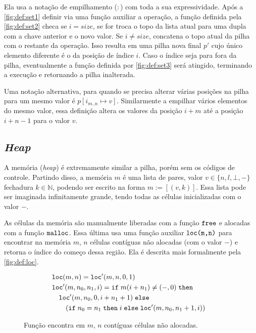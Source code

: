 Ela usa a notação de empilhamento ($:$) com toda a sua expressividade. Após a \autoref{fig:def:set1} definir via uma função auxiliar a operação, a função definida pela \autoref{fig:def:set2} checa se $i = size$, se for troca o topo da lista atual para uma dupla com a chave anterior e o novo valor. Se $i \neq size$, concatena o topo atual da pilha com o restante da operação. Isso resulta em uma pilha nova final $p'$ cujo único elemento diferente é o da posição de índice $i$. Caso o índice seja para fora da pilha, eventualmente a função definida por \autoref{fig:def:set3} será atingido, terminando a execução e retornando a pilha inalterada.

Uma notação alternativa, para quando se precisa alterar várias posições na pilha para um mesmo valor é $p[i_{m..n} \mapsto v]$. Similarmente a empilhar vários elementos do mesmo valor, essa definição altera os valores da posição $i + m$ até a posição $i + n - 1$ para o valor $v$.


\subsection{\emph{Heap}}
\label{sec:pcl-back:mem}

A memória (\emph{heap}) é extremamente similar a pilha, porém sem os códigos de controle. Partindo disso, a memória $m$ é uma lista de pares, valor $v \in \{n, l, \bot, -\}$ fechadura $k \in \mathbb{N}$, podendo ser escrito na forma $m := [(v, k)]$. Essa lista pode ser imaginada infinitamente grande, tendo todas as células inicializadas com o valor $-$.

As células da memória são manualmente liberadas com a função $\texttt{free}$ e alocadas com a função $\texttt{malloc}$. Essa última usa uma função auxiliar $\texttt{loc(m,n)}$ para encontrar na memória $m$, $n$ células contíguas não alocadas (com o valor $-$) e retorna o índice do começo dessa região. Ela é descrita mais formalmente pela \autoref{fig:def:loc}. 

\begin{figure}[ht]
	\begin{align}
	&\texttt{loc}(m,n) = \texttt{loc}'(m, n, 0, 1) \label{fig:def:loc1}\\
	& \texttt{loc}'(m, n_0 , n_1, i) = \texttt{if}\; m(i + n_1) \neq (-,0) \; \texttt{then}\nonumber \\
	&\quad\texttt{loc}'(m, n_0, 0, i + n_1 + 1)\; \texttt{else} \nonumber\\
	&\quad\quad(\texttt{if}\; n_0 = n_1 \; \texttt{then}\; i \;\texttt{else}\; \texttt{loc}'(m, n_0, n_1 + 1, i)) \label{fig:def:loc2}
	\end{align}
	\caption{Função encontra em $m$, $n$ contíguas células não alocadas.}
	\label{fig:def:loc}
\end{figure}

